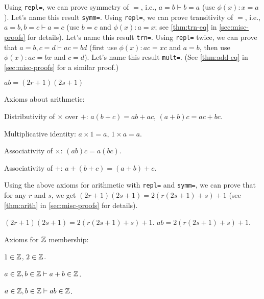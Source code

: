 Using \texttt{repl=}, we can prove symmetry of $=$, i.e.,
$a = b \vdash b = a$ (use $\phi(x): x = a$).
Let's name this result \texttt{symm=}.
Using \texttt{repl=}, we can prove transitivity of $=$, i.e.,
$a = b, b = c \vdash a = c$ (use $b = c$ and $\phi(x): a = x$;
see \cref{thm:trn-eq} in \cref{sec:misc-proofs} for details).
Let's name this result \texttt{trn=}.
Using \texttt{repl=} twice, we can prove that $a = b, c = d \vdash ac = bd$
(first use $\phi(x): ac = xc$ and $a = b$, then use $\phi(x): ac = bx$ and $c = d$).
Let's name this result \texttt{mult=}.
(See \cref{thm:add-eq} in \cref{sec:misc-proofs} for a similar proof.)

\begin{formalproof}
\State \label{p1:abeq}$ab = (2r + 1)(2s + 1)$
\end{formalproof}

Axioms about arithmetic:
\begin{tightemize}
\item Distributivity of $\times$ over $+$: $a(b+c) = ab + ac$, $(a+b)c = ac + bc$.
\item Multiplicative identity: $a \times 1 = a$, $1 \times a = a$.
\item Associativity of $\times$: $(ab)c = a(bc)$.
\item Associativity of $+$: $a + (b + c) = (a + b) + c$.
\end{tightemize}

Using the above axioms for arithmetic with \texttt{repl=} and \texttt{symm=},
we can prove that for any $r$ and $s$, we get $(2r+1)(2s+1) = 2(r(2s+1)+s) + 1$
(see \cref{thm:arith} in \cref{sec:misc-proofs} for details).

\begin{formalproof}
\State \label{p1:abeq2}$(2r+1)(2s+1) = 2(r(2s+1)+s) + 1$.
\State \label{p1:abeq3}$ab = 2(r(2s+1)+s) + 1$.
\end{formalproof}

Axioms for $\mathbb{Z}$ membership:
\begin{tightemize}
\item $1 \in \mathbb{Z}$, $2 \in \mathbb{Z}$.
\item $a \in \mathbb{Z}, b \in \mathbb{Z} \vdash a + b \in \mathbb{Z}$.
\item $a \in \mathbb{Z}, b \in \mathbb{Z} \vdash ab \in \mathbb{Z}$.
\end{tightemize}

